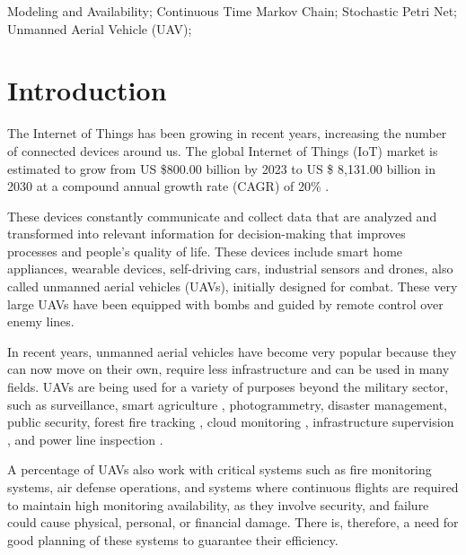 \documentclass[conference]{IEEEtran}
\begin{document}
\begin{IEEEkeywords}
Modeling and Availability; Continuous Time Markov Chain; Stochastic Petri Net; Unmanned Aerial Vehicle (UAV);
\end{IEEEkeywords}

\section{Introduction}\label{sec:introduction}

The Internet of Things has been growing in recent years, increasing the number of connected devices around us. The global Internet of Things (IoT) market is estimated to grow from US \$800.00 billion by 2023 to US \$ 8,131.00 billion in 2030 at a compound annual growth rate (CAGR) of 20\% \citep{al2020internet}.

These devices constantly communicate and collect data that are analyzed and transformed into relevant information for decision-making that improves processes and people’s quality of life. These devices include smart home appliances, wearable devices, self-driving cars, industrial sensors and drones, also called unmanned aerial vehicles (UAVs), initially designed for combat. These very large UAVs have been equipped with bombs and guided by remote control over enemy lines.

In recent years, unmanned aerial vehicles have become very popular because they can now move on their own, require less infrastructure and can be used in many fields. UAVs are being used for a variety of purposes beyond the military sector, such as surveillance\citep{basilico2015deploying}, smart agriculture \citep{lottes2017uav}, photogrammetry\citep{cesetti2011visual}, disaster management, public security\citep {maza2011experimental}, forest fire tracking \citep{pham2017distributed}, cloud monitoring \citep{renzaglia2016monitoring}, infrastructure supervision \citep{guerrero2013uav}, and power line inspection \citep{chang2017development}.

A percentage of UAVs also work with critical systems such as fire monitoring systems, air defense operations, and systems where continuous flights are required to maintain high monitoring availability, as they involve security, and failure could cause physical, personal, or financial damage. There is, therefore, a need for good planning of these systems to guarantee their efficiency.

\end{document}
